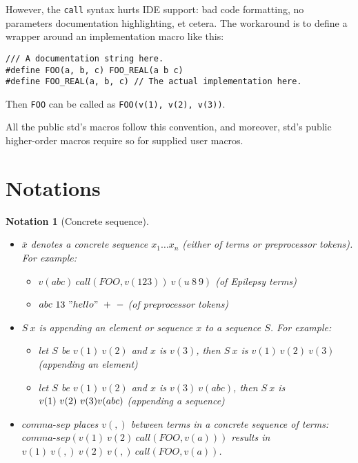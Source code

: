 \documentclass[12pt]{article}
\theoremstyle{break}
\newtheorem{notation}{Notation}
\begin{document}
However, the \texttt{call} syntax hurts IDE support: bad code formatting, no parameters
documentation highlighting, et cetera. The workaround is to define a wrapper around
an implementation macro like this:

\begin{verbatim}
/// A documentation string here.
#define FOO(a, b, c) FOO_REAL(a b c)
#define FOO_REAL(a, b, c) // The actual implementation here.
\end{verbatim}

Then \texttt{FOO} can be called as \texttt{FOO(v(1), v(2), v(3))}.

All the public std's macros follow this convention, and moreover, std's public
higher-order macros require so for supplied user macros.

\section{Notations}

\begin{notation}[Concrete sequence]
    \begin{itemize}
        \item $\overline{x}$ denotes a concrete sequence $x_1 \ldots x_n$ (either of terms
        or preprocessor tokens). For example:
        \begin{itemize}
            \item $v(abc) \ call(FOO, v(123)) \ v(u \ 8 \ 9)$ (of Epilepsy terms)
            \item $abc \ 13 \ "hello" \ + \ -$ (of preprocessor tokens)
        \end{itemize}
        \item $S \ x$ is appending an element or sequence $x$ to a sequence $S$. For
        example:
        \begin{itemize}
            \item let $S$ be $v(1) \ v(2)$ and $x$ is $v(3)$, then $S \ x$ is $v(1) \ v(2) \ v(3)$
            (appending an element)
            \item let $S$ be $v(1) \ v(2)$ and $x$ is $v(3) \ v(abc)$, then $S \ x$ is $v(1) \ v(2) \ v(3) \\ v(abc)$
            (appending a sequence)
        \end{itemize}
        \item $comma\mbox{-}sep$ places $v(,)$ between terms in a concrete sequence of terms:\\
        $comma\mbox{-}sep(v(1) \ v(2) \ call(FOO, v(a)))$ results in\\
        $v(1) \ v(,) \ v(2) \ v(,) \ call(FOO, v(a))$.
    \end{itemize}
\end{notation}
\end{document}
